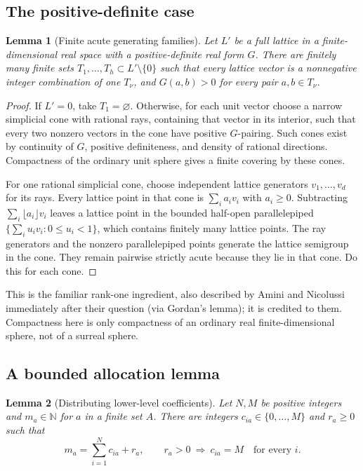 \documentclass[11pt,letterpaper]{article}
\newtheorem{lemma}[lemma]{Lemma}
\theoremstyle{definition}
\newcommand{\N}{\mathbb N}
\begin{document}
\subsection{The positive-definite case}

\begin{lemma}[Finite acute generating families]\label{tate:theta:lem:acute}
Let $L'$ be a full lattice in a finite-dimensional real space with a
positive-definite real form $G$. There are finitely many finite sets
$T_1,\ldots,T_h\subset L'\setminus\{0\}$ such that every lattice vector is a
nonnegative integer combination of one $T_\nu$, and $G(a,b)>0$ for every
pair $a,b\in T_\nu$.
\end{lemma}

\begin{proof}
If $L'=0$, take $T_1=\varnothing$. Otherwise, for each unit vector choose a
narrow simplicial cone with rational rays, containing that vector in its
interior, such that every two nonzero vectors in the cone have positive
$G$-pairing. Such cones exist by continuity of $G$, positive definiteness,
and density of rational directions. Compactness of the ordinary unit sphere
gives a finite covering by these cones.

For one rational simplicial cone, choose independent lattice generators
$v_1,\ldots,v_d$ for its rays. Every lattice point in that cone is
$\sum_ia_iv_i$ with $a_i\ge0$. Subtracting $\sum_i\lfloor a_i\rfloor v_i$
leaves a lattice point in the bounded half-open parallelepiped
$\{\sum_iu_iv_i:0\le u_i<1\}$, which contains finitely many lattice points.
The ray generators and the nonzero parallelepiped points generate the
lattice semigroup in the cone. They remain pairwise strictly acute because
they lie in that cone. Do this for each cone.
\end{proof}

This is the familiar rank-one ingredient, also described by Amini and
Nicolussi immediately after their question (via Gordan's lemma); it is
credited to them. Compactness here is only compactness of an ordinary real
finite-dimensional sphere, not of a surreal sphere.

\subsection{A bounded allocation lemma}

\begin{lemma}[Distributing lower-level coefficients]\label{tate:theta:lem:allocation}
Let $N,M$ be positive integers and $m_a\in\N$ for $a$ in a finite set $A$.
There are integers $c_{ia}\in\{0,\ldots,M\}$ and $r_a\ge0$ such that
\[
 m_a=\sum_{i=1}^Nc_{ia}+r_a,
 \qquad r_a>0\ \Longrightarrow\ c_{ia}=M\quad\text{for every }i.
\]
\end{lemma}
\end{document}
